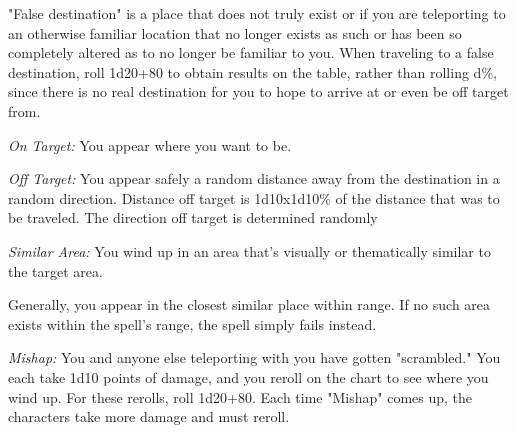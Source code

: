 "False destination" is a place that does not truly exist or if you are teleporting 
to an otherwise familiar location that no longer exists as such or has been so 
completely altered as to no longer be familiar to you. When traveling to a false 
destination, roll 1d20+80 to obtain results on the table, rather than rolling d\%, 
since there is no real destination for you to hope to arrive at or even be off 
target from.

\textit{On Target:} You appear where you want to be.

\textit{Off Target:} You appear safely a random distance away from the destination 
in a random direction. Distance off target is 1d10x1d10\% of the distance that 
was to be traveled. The direction off target is determined randomly

\textit{Similar Area:} You wind up in an area that's visually or thematically similar 
to the target area.

Generally, you appear in the closest similar place within range. If no such area 
exists within the spell's range, the spell simply fails instead.

\textit{Mishap:} You and anyone else teleporting with you have gotten "scrambled." 
You each take 1d10 points of damage, and you reroll on the chart to see where you 
wind up. For these rerolls, roll 1d20+80. Each time "Mishap" comes up, the characters 
take more damage and must reroll.

